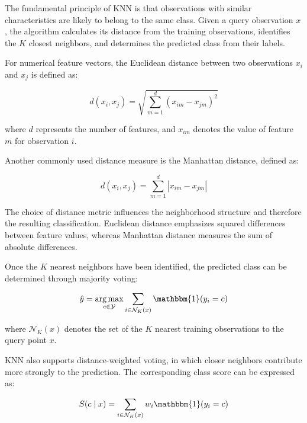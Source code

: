 The fundamental principle of KNN is that observations with similar characteristics are likely to belong to the same class. Given a query observation $x$, the algorithm calculates its distance from the training observations, identifies the $K$ closest neighbors, and determines the predicted class from their labels.

For numerical feature vectors, the Euclidean distance between two observations $x_i$ and $x_j$ is defined as:

\begin{equation}
    d(x_i,x_j)
    =
    \sqrt{
    \sum_{m=1}^{d}
    (x_{im}-x_{jm})^2
    }
    \label{eq:euclidean-distance}
\end{equation}

where $d$ represents the number of features, and $x_{im}$ denotes the value of feature $m$ for observation $i$.

Another commonly used distance measure is the Manhattan distance, defined as:

\begin{equation}
    d(x_i,x_j)
    =
    \sum_{m=1}^{d}
    |x_{im}-x_{jm}|
    \label{eq:manhattan-distance}
\end{equation}

The choice of distance metric influences the neighborhood structure and therefore the resulting classification. Euclidean distance emphasizes squared differences between feature values, whereas Manhattan distance measures the sum of absolute differences.

Once the $K$ nearest neighbors have been identified, the predicted class can be determined through majority voting:

\begin{equation}
    \hat{y}
    =
    \underset{c \in \mathcal{Y}}{\arg\max}
    \sum_{i \in \mathcal{N}_K(x)}
    \mathbbm{1}(y_i=c)
    \label{eq:knn-uniform}
\end{equation}

where $\mathcal{N}_K(x)$ denotes the set of the $K$ nearest training observations to the query point $x$.

KNN also supports distance-weighted voting, in which closer neighbors contribute more strongly to the prediction. The corresponding class score can be expressed as:

\begin{equation}
    S(c \mid x)
    =
    \sum_{i \in \mathcal{N}_K(x)}
    w_i \mathbbm{1}(y_i=c)
    \label{eq:knn-weighted}
\end{equation}

